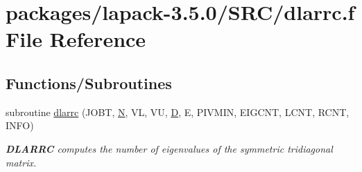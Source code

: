 \hypertarget{dlarrc_8f}{}\section{packages/lapack-\/3.5.0/\+S\+R\+C/dlarrc.f File Reference}
\label{dlarrc_8f}
\subsection*{Functions/\+Subroutines}
\begin{DoxyCompactItemize}
\item 
subroutine \hyperlink{group__auxOTHERauxiliary_gac6a65096bc8be9a4dc881a96147075ea}{dlarrc} (J\+O\+B\+T, \hyperlink{polmisc_8c_a0240ac851181b84ac374872dc5434ee4}{N}, V\+L, V\+U, \hyperlink{odrpack_8h_a7dae6ea403d00f3687f24a874e67d139}{D}, E, P\+I\+V\+M\+I\+N, E\+I\+G\+C\+N\+T, L\+C\+N\+T, R\+C\+N\+T, I\+N\+F\+O)
\begin{DoxyCompactList}\small\item\em {\bfseries D\+L\+A\+R\+R\+C} computes the number of eigenvalues of the symmetric tridiagonal matrix. \end{DoxyCompactList}\end{DoxyCompactItemize}

